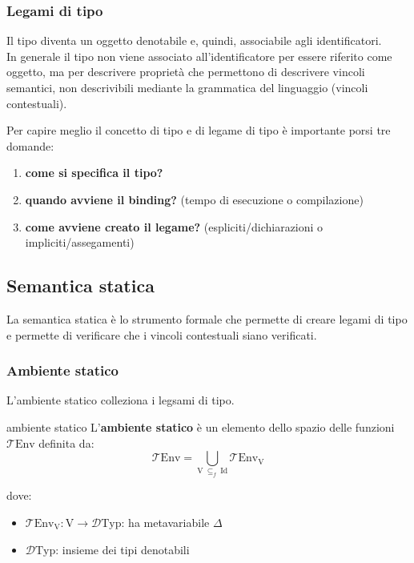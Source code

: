 \subsubsection{Legami di tipo}
Il tipo diventa un oggetto denotabile e, quindi, associabile agli identificatori.\\[0.2ex]
In generale il tipo non viene associato all'identificatore per essere riferito come oggetto, ma per descrivere proprietà che permettono di descrivere vincoli semantici, non descrivibili mediante la grammatica del linguaggio (vincoli contestuali).

\smallskip
Per capire meglio il concetto di tipo e di legame di tipo è importante porsi tre domande:
\begin{enumerate}[itemsep=\smallskipamount]
    \item \textbf{come si specifica il tipo?}
    \item \textbf{quando avviene il binding?} (tempo di esecuzione o compilazione)
    \item \textbf{come avviene creato il legame?} (espliciti/dichiarazioni o impliciti/assegamenti)
\end{enumerate}

\subsection{Semantica statica}
La semantica statica è lo strumento formale che permette di creare legami di tipo e permette di verificare che i vincoli contestuali siano verificati.

\subsubsection{Ambiente statico}
L'ambiente statico colleziona i legsami di tipo.

\begin{mydef}{ambiente statico}
    L'\textbf{ambiente statico} è un elemento dello spazio delle funzioni $\mathrm{\mathcal{T}\mathrm{Env}}$ definita da:
    \[
        \mathcal{T}\mathrm{Env} = \bigcup\limits_{\mathrm{V} \ \subseteq_f \ \mathrm{Id}} \mathcal{T}\mathrm{Env}_\mathrm{V}
    \]

    dove:
    \begin{itemize}[label=$\triangleright$, itemsep=\medskipamount]
        \item $\mathcal{T}\mathrm{Env}_\mathrm{V}: \mathrm{V} \rightarrow \mathcal{D}\mathrm{Typ}$: ha metavariabile $\Delta$
        \item $\mathcal{D}\mathrm{Typ}$: insieme dei tipi denotabili
    \end{itemize}
\end{mydef}


